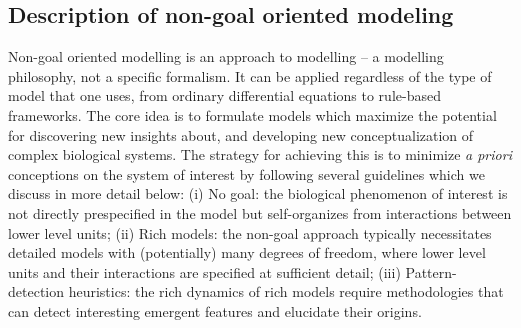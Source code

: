 \subsection{Description of non-goal oriented modeling}

Non-goal oriented modelling is an approach to modelling -- a modelling philosophy, not a specific formalism. It can be applied regardless of the type of model that one uses, from ordinary differential equations to rule-based frameworks. The core idea is to formulate models which maximize the potential for discovering new insights about, and developing new conceptualization of complex biological systems. The strategy for achieving this is to minimize \emph{a priori} conceptions on the system of interest by following several guidelines which we discuss in more detail below: (i) No goal: the biological phenomenon of interest is not directly prespecified in the model but self-organizes from interactions between lower level units; (ii) Rich models: the non-goal approach typically necessitates detailed models with (potentially) many degrees of freedom, where lower level units and their interactions are specified at sufficient detail; (iii) Pattern-detection heuristics: the rich dynamics of rich models require methodologies that can  detect interesting emergent features and elucidate their origins.

  